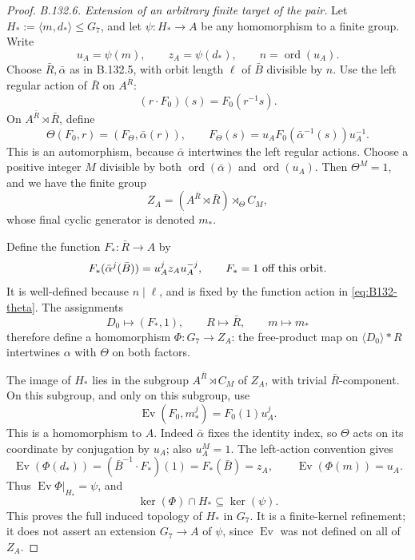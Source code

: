 \begin{proof}
\emph{B.132.6. Extension of an arbitrary finite target of the pair.}
Let \(H_*:=\langle m,d_*\rangle\leq G_7\), and let
\(\psi:H_*\to A\) be any homomorphism to a finite group.
Write
\[
 u_A=\psi(m),\qquad z_A=\psi(d_*),\qquad
 n=\operatorname{ord}(u_A).
\]
Choose \(\bar R,\bar\alpha\) as in B.132.5, with orbit length
\(\ell\) of \(\bar B\) divisible by \(n\).
Use the left regular action of \(\bar R\) on \(A^{\bar R}\):
\[
 (r\cdot F_0)(s)=F_0(r^{-1}s).
\]
On \(A^{\bar R}\rtimes\bar R\), define
\begin{equation}\label{eq:B132-theta}
 \Theta(F_0,r)=(F_\Theta,\bar\alpha(r)),\qquad
 F_\Theta(s)=u_A F_0(\bar\alpha^{-1}(s))u_A^{-1}.
\end{equation}
This is an automorphism, because \(\bar\alpha\) intertwines the
left regular actions. Choose a positive integer \(M\) divisible
by both \(\operatorname{ord}(\bar\alpha)\) and
\(\operatorname{ord}(u_A)\). Then \(\Theta^M=1\), and we have
the finite group
\[
 Z_A=(A^{\bar R}\rtimes\bar R)\rtimes_\Theta C_M,
\]
whose final cyclic generator is denoted \(m_*\).

Define the function \(F_*:\bar R\to A\) by
\begin{equation}\label{eq:B132-lamp}
 F_*(\bar\alpha^j(\bar B))=u_A^jz_Au_A^{-j},
 \qquad F_*=1\ \hbox{off this orbit}.
\end{equation}
It is well-defined because \(n\mid\ell\), and is fixed by
the function action in \eqref{eq:B132-theta}. The assignments
\[
 D_0\longmapsto(F_*,1),\qquad
 R\longmapsto\bar R,\qquad m\longmapsto m_*
\]
therefore define a homomorphism \(\Phi:G_7\to Z_A\): the
free-product map on \(\langle D_0\rangle*R\) intertwines
\(\alpha\) with \(\Theta\) on both factors.

The image of \(H_*\) lies in the subgroup
\(A^{\bar R}\rtimes C_M\) of \(Z_A\), with trivial
\(\bar R\)-component. On this subgroup, and only on this
subgroup, use
\begin{equation}\label{eq:B132-evaluation}
 \operatorname{Ev}(F_0,m_*^j)=F_0(1)u_A^j.
\end{equation}
This is a homomorphism to \(A\). Indeed \(\bar\alpha\) fixes
the identity index, so \(\Theta\) acts on its coordinate by
conjugation by \(u_A\); also \(u_A^M=1\). The left-action
convention gives
\[
 \operatorname{Ev}(\Phi(d_*))
   =(\bar B^{-1}\cdot F_*)(1)=F_*(\bar B)=z_A,
 \qquad \operatorname{Ev}(\Phi(m))=u_A.
\]
Thus \(\operatorname{Ev}\Phi|_{H_*}=\psi\), and
\begin{equation}\label{eq:B132-kernel-containment}
 \ker(\Phi)\cap H_*\subseteq\ker(\psi).
\end{equation}
This proves the full induced topology of \(H_*\) in \(G_7\).
It is a finite-kernel refinement; it does not assert an extension
\(G_7\to A\) of \(\psi\), since \(\operatorname{Ev}\) was
not defined on all of \(Z_A\).


\end{proof}
